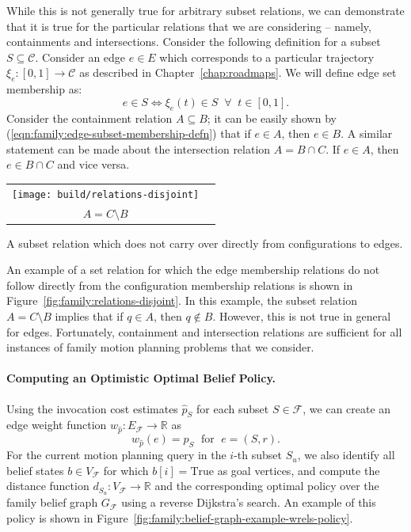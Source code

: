 While this is not generally true for arbitrary subset relations,
we can demonstrate that it is true for the particular relations that
we are considering -- namely, containments and intersections.
Consider the following definition
for a subset $S \subseteq \mathcal{C}$.
Consider an edge $e \in E$ which corresponds to a particular trajectory
$\xi_e : [0,1] \rightarrow \mathcal{C}$
as described in Chapter~\ref{chap:roadmaps}.
We will define edge set membership as:
\begin{equation}
   e \in S \iff \xi_e(t) \in S \;\;\forall\;\; t \in [0,1].
   \label{eqn:family:edge-subset-membership-defn}
\end{equation}
Consider the containment relation $A \subseteq B$;
it can be easily shown by (\ref{eqn:family:edge-subset-membership-defn})
that if $e \in A$, then $e \in B$.
A similar statement can be made about the intersection relation
$A = B \cap C$.
If $e \in A$, then $e \in B \cap C$ and vice versa.

\begin{marginfigure}
   \centering
   \begin{tabular}{cc}
      \texttt{[image: build/relations-disjoint]} \\
      $A = C \setminus B$ \\
   \end{tabular}
   \caption{A subset relation which does not carry over directly
      from configurations to edges.}
   \label{fig:family:relations-disjoint}
\end{marginfigure}

An example of a set relation for which the edge membership relations
do not follow directly from the configuration membership relations
is shown in Figure~\ref{fig:family:relations-disjoint}.
In this example,
the subset relation $A = C \setminus B$ implies that if $q \in A$,
then $q \notin B$.
However,
this is not true in general for edges.
Fortunately,
containment and intersection relations are sufficient for all
instances of family motion planning problems that we consider.

\paragraph{Computing an Optimistic Optimal Belief Policy.}
Using the invocation cost estimates $\hat{p}_S$
for each subset $S \in \mathcal{F}$,
we can create an edge weight function
$w_{\hat{p}} : E_{\mathcal{F}} \rightarrow \mathbb{R}$ as
\begin{equation}
   w_{\hat{p}}(e) = \hat{p}_S \;\mbox{ for }\; e = (S,r).
\end{equation}
For the current motion planning query in the $i$-th subset $S_u$,
we also identify all belief states $b \in V_{\mathcal{F}}$
for which $b[i] = \mbox{True}$
as goal vertices,
and compute the distance function
$d_{S_u} :  V_{\mathcal{F}} \rightarrow \mathbb{R}$
and the corresponding optimal policy
over the family belief graph $G_{\mathcal{F}}$ using a reverse
Dijkstra's search.
An example of this policy is shown
in Figure~\ref{fig:family:belief-graph-example-wrels-policy}.

